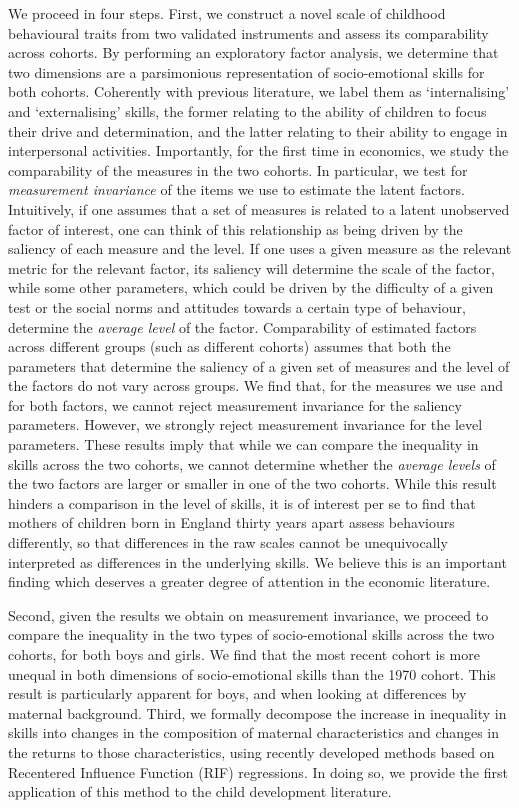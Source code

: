 We proceed in four steps. First, we construct a novel scale of childhood behavioural traits from two validated instruments and assess its comparability across cohorts. By performing an exploratory factor analysis, we determine that two dimensions are a parsimonious representation of socio-emotional skills for both cohorts. Coherently with previous literature, we label them as `internalising' and `externalising' skills, the former relating to the ability of children to focus their drive and determination, and the latter relating to their ability to engage in interpersonal activities. Importantly, for the first time in economics, we study the comparability of the measures in the two cohorts. In particular, we test for \emph{measurement invariance} of the items we use to estimate the latent factors. Intuitively, if one assumes that a set of measures is related to a latent unobserved factor of interest, one can think of this relationship as being driven by the saliency of each measure and the level. If one uses a given measure as the relevant metric for the relevant factor, its saliency will determine the scale of the factor, while some other parameters, which could be driven by the difficulty of a given test or the social norms and attitudes towards a certain type of behaviour, determine the \emph{average level} of the factor. Comparability of estimated factors across different groups (such as different cohorts) assumes  that both the parameters that determine the saliency of a given set of measures and the level of the factors do not vary across groups. We find that, for the measures we use and for both factors, we cannot reject measurement invariance for the saliency parameters. However, we strongly reject measurement invariance for the level parameters. These results imply that while we can compare the inequality in skills across the two cohorts, we cannot determine whether the \emph{average levels} of the two factors are larger or smaller in one of the two cohorts. While this result hinders a comparison in the level of skills, it is of interest per se to find that mothers of children born in England thirty years apart assess behaviours differently, so that differences in the raw scales cannot be unequivocally interpreted as differences in the underlying skills. We believe this is an important finding which deserves a greater degree of attention in the economic literature.

Second, given the results we obtain on measurement invariance, we proceed to compare the inequality in the two types of socio-emotional skills across the two cohorts, for both boys and girls. We find that the most recent cohort is more unequal in both dimensions of socio-emotional skills than the 1970 cohort. This result is particularly apparent for boys, and when looking at differences by maternal background. Third, we formally decompose the increase in inequality in skills into changes in the composition of maternal characteristics and changes in the returns to those characteristics, using recently developed methods based on Recentered Influence Function (RIF) regressions. In doing so, we provide the first application of this method to the child development literature.

